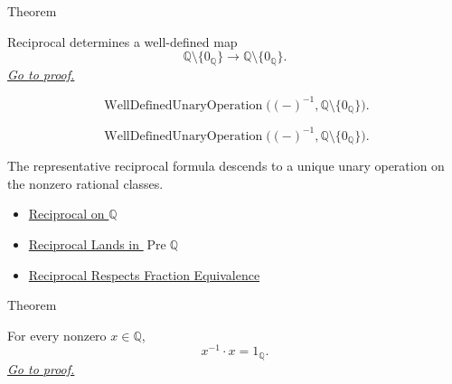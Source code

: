 \begin{theorembox}{Theorem}
\begin{theorem}
\label{thm:reciprocal-on-q-well-defined}
Reciprocal determines a well-defined map
\[
\mathbb{Q}\setminus\{0_{\mathbb{Q}}\}\to\mathbb{Q}\setminus\{0_{\mathbb{Q}}\}.
\]
\hyperref[prf:reciprocal-on-q-well-defined]{\textit{Go to proof.}}
\end{theorem}
\end{theorembox}

\begin{remark*}
\[
\operatorname{WellDefinedUnaryOperation}
\bigl((-)^{-1},\mathbb{Q}\setminus\{0_{\mathbb{Q}}\}\bigr).
\]
\end{remark*}

\begin{remark*}
\[
\operatorname{WellDefinedUnaryOperation}
\bigl((-)^{-1},\mathbb{Q}\setminus\{0_{\mathbb{Q}}\}\bigr).
\]
\end{remark*}

\begin{remark*}[Interpretation]
The representative reciprocal formula descends to a unique unary operation on
the nonzero rational classes.
\end{remark*}

\begin{dependencies}
\begin{itemize}
  \item \hyperref[def:reciprocal-on-q-classes]{Reciprocal on $\mathbb{Q}$}
  \item \hyperref[lem:reciprocal-denominator-nonzero-q]{Reciprocal Lands in $\operatorname{Pre}\mathbb{Q}$}
  \item \hyperref[lem:reciprocal-on-q-respects-equivalence]{Reciprocal Respects Fraction Equivalence}
\end{itemize}
\end{dependencies}

\begin{theorembox}{Theorem}
\begin{theorem}
\label{thm:reciprocal-left-multiplicative-inverse-on-q}
For every nonzero $x\in\mathbb{Q}$,
\[
x^{-1}\cdot x=1_{\mathbb{Q}}.
\]
\hyperref[prf:reciprocal-left-multiplicative-inverse-on-q]{\textit{Go to proof.}}
\end{theorem}
\end{theorembox}

